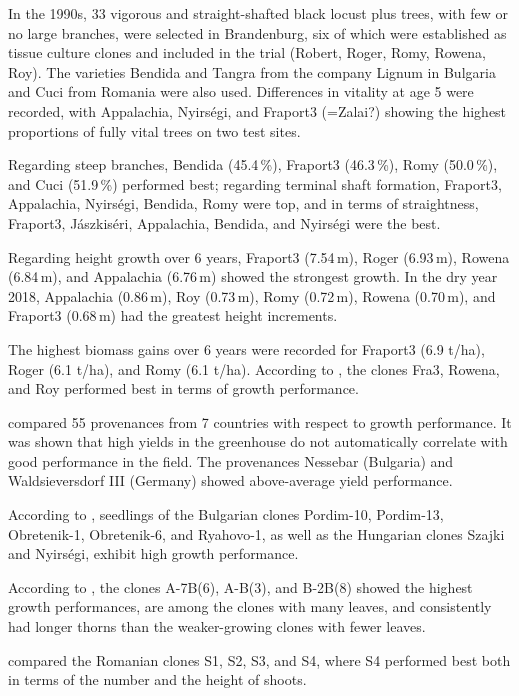 In the 1990s, 33 vigorous and straight-shafted black locust plus trees,
with few or no large branches, were selected in Brandenburg, six of which
were established as tissue culture clones and included in the trial
(Robert, Roger, Romy, Rowena, Roy). The varieties Bendida and Tangra from the
company Lignum in Bulgaria and Cuci from Romania were also used. Differences
in vitality at age 5 were recorded, with Appalachia, Nyirségi, and Fraport3
(=Zalai?) showing the highest proportions of fully vital trees on two test sites.

Regarding steep branches, Bendida (45.4\,\%), Fraport3 (46.3\,\%),
Romy (50.0\,\%), and Cuci (51.9\,\%) performed best; regarding terminal
shaft formation, Fraport3, Appalachia, Nyirségi, Bendida, Romy were top,
and in terms of straightness, Fraport3, Jászkiséri, Appalachia, Bendida,
and Nyirségi were the best.

Regarding height growth over 6 years, Fraport3 (7.54\,m), Roger (6.93\,m),
Rowena (6.84\,m), and Appalachia (6.76\,m) showed the strongest growth.
In the dry year 2018, Appalachia (0.86\,m), Roy (0.73\,m), Romy (0.72\,m),
Rowena (0.70\,m), and Fraport3 (0.68\,m) had the greatest height increments.

The highest biomass gains over 6 years were recorded for Fraport3 (6.9 t/ha),
Roger (6.1 t/ha), and Romy (6.1 t/ha). According to \citet{loeffler2017fastwood},
the clones Fra3, Rowena, and Roy performed best in terms of growth performance.

\citet{guse2015robinie} compared 55 provenances from 7 countries with
respect to growth performance. It was shown that high yields in the greenhouse
do not automatically correlate with good performance in the field.
The provenances Nessebar (Bulgaria) and Waldsieversdorf III (Germany)
showed above-average yield performance.

According to \citet{dimitrova2024robinie}, seedlings of the Bulgarian clones
Pordim-10, Pordim-13, Obretenik-1, Obretenik-6, and Ryahovo-1, as well as
the Hungarian clones Szajki and Nyirségi, exhibit high growth performance.

According to \citet{diniPapanastasi2004robinie}, the clones A-7B(6),
A-B(3), and B-2B(8) showed the highest growth performances, are among
the clones with many leaves, and consistently had longer thorns than the
weaker-growing clones with fewer leaves.

\citet{budaeu2023robinie} compared the Romanian clones S1, S2, S3, and S4,
where S4 performed best both in terms of the number and the height of shoots.

